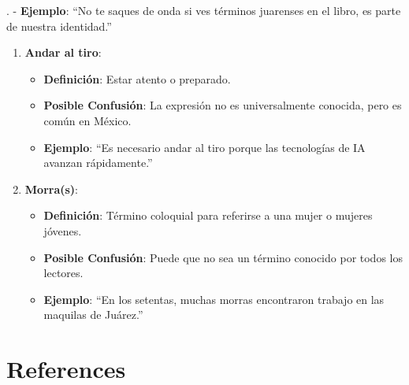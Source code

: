 \documentclass[
  10pt,
  letterpaper,
]{book}
\providecommand{\tightlist}{%
  \setlength{\itemsep}{0pt}\setlength{\parskip}{0pt}}\usepackage{longtable,booktabs,array}
\begin{document}
. - \textbf{Ejemplo}: ``No te saques de onda si ves términos juarenses
en el libro, es parte de nuestra identidad.''

\begin{enumerate}
\def\labelenumi{\arabic{enumi}.}
\setcounter{enumi}{8}
\tightlist
\item
  \textbf{Andar al tiro}:

  \begin{itemize}
  \tightlist
  \item
    \textbf{Definición}: Estar atento o preparado.
  \item
    \textbf{Posible Confusión}: La expresión no es universalmente
    conocida, pero es común en México.
  \item
    \textbf{Ejemplo}: ``Es necesario andar al tiro porque las
    tecnologías de IA avanzan rápidamente.''
  \end{itemize}
\item
  \textbf{Morra(s)}:

  \begin{itemize}
  \tightlist
  \item
    \textbf{Definición}: Término coloquial para referirse a una mujer o
    mujeres jóvenes.
  \item
    \textbf{Posible Confusión}: Puede que no sea un término conocido por
    todos los lectores.
  \item
    \textbf{Ejemplo}: ``En los setentas, muchas morras encontraron
    trabajo en las maquilas de Juárez.''
  \end{itemize}
\end{enumerate}


\chapter*{References}\label{references}

\end{document}
